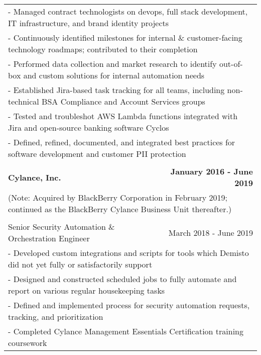 \documentclass[letterpaper]{article}
\begin{document}
\begin{center}
\begin{tabular}{p{}p{}r}
			\\
				\multicolumn{3}{p{\textwidth}}{\quad\quad - Managed contract technologists on devops, full stack development, IT infrastructure, and brand identity projects} 
			\\
				\multicolumn{3}{p{\textwidth}}{\quad\quad - Continuously identified milestones for internal \& customer-facing technology roadmaps; contributed to their completion} 
			\\
				\multicolumn{3}{p{\textwidth}}{\quad\quad - Performed data collection and market research to identify out-of-box and custom solutions for internal automation needs}  
			\\
				\multicolumn{3}{p{\textwidth}}{\quad\quad - Established Jira-based task tracking for all teams, including non-technical BSA Compliance and Account Services groups}
			\\
				\multicolumn{3}{p{\textwidth}}{\quad\quad - Tested and troubleshot AWS Lambda functions integrated with Jira and open-source banking software Cyclos} 
			\\
				\multicolumn{3}{p{\textwidth}}{\quad\quad - Defined, refined, documented, and integrated best practices for software development and customer PII protection}
			\\
			\\
				\textbf{Cylance, Inc.} & &
				\textbf{January 2016 - June 2019\quad}
			\\		%
				\multicolumn{3}{p{\textwidth}}{(Note: Acquired by BlackBerry Corporation in February 2019; continued as the BlackBerry Cylance Business Unit thereafter.)}
			\\
			\\
				\multicolumn{2}{p{0.5\textwidth}}{\quad Senior Security Automation \& Orchestration Engineer}
				&
				{March 2018 - June 2019 \quad\quad\quad\quad}
			\\
				\multicolumn{3}{p{\textwidth}}{\quad\quad - Developed custom integrations and scripts for tools which Demisto did not yet fully or satisfactorily support}
			\\
				\multicolumn{3}{p{\textwidth}}{\quad\quad - Designed and constructed scheduled jobs to fully automate and report on various regular housekeeping tasks}
			\\
				\multicolumn{3}{p{\textwidth}}{\quad\quad - Defined and implemented process for security automation requests, tracking, and prioritization}
			\\
				\multicolumn{3}{p{\textwidth}}{\quad\quad - Completed Cylance Management Essentials Certification training coursework}

\end{tabular}
\end{center}
\end{document}
